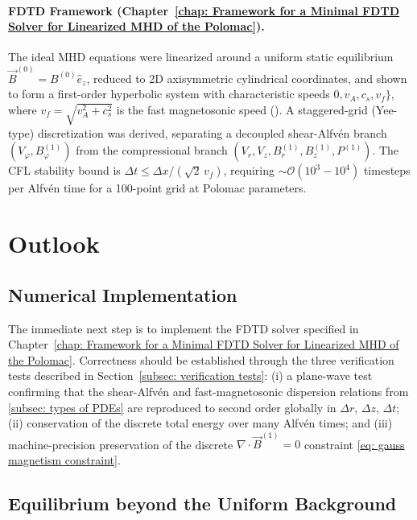 \paragraph{FDTD Framework (Chapter~\ref{chap: Framework for a Minimal FDTD Solver for Linearized MHD of the Polomac}).}
The ideal MHD equations were linearized around a uniform static equilibrium
$\vec{B}^{(0)}=B^{(0)}\hat{e}_z$, reduced to 2D axisymmetric cylindrical coordinates,
and shown to form a first-order hyperbolic system with characteristic speeds
$0, v_A, c_s, v_f\}$, where $v_f=\sqrt{v_A^2+c_s^2}$ is the fast
magnetosonic speed (\cite{Freidberg2014}).
A staggered-grid (Yee-type) discretization was derived, separating a decoupled
shear-Alfvén branch $(V_\varphi,B^{(1)}_\varphi)$ from the compressional branch
$(V_r,V_z,B^{(1)}_r,B^{(1)}_z,P^{(1)})$.
The CFL stability bound is $\Delta t\leq\Delta x/(\sqrt{2}\,v_f)$, requiring
$\sim\mathcal{O}(10^3-10^4)$ timesteps per Alfvén time for a 100-point grid at Polomac
parameters.

\section{Outlook}
\label{sec: outlook}

\subsection{Numerical Implementation}
\label{subsec: numerical implementation}

The immediate next step is to implement the FDTD solver specified in
Chapter~\ref{chap: Framework for a Minimal FDTD Solver for Linearized MHD of the Polomac}.
Correctness should be established through the three verification tests described in
Section~\ref{subsec: verification tests}:
(i) a plane-wave test confirming that the shear-Alfvén and fast-magnetosonic dispersion
relations from \autoref{subsec: types of PDEs} are
reproduced to second order globally in $\Delta r$, $\Delta z$, $\Delta t$;
(ii) conservation of the discrete total energy over many Alfvén times; and
(iii) machine-precision preservation of the discrete $\nabla\cdot\vec{B}^{(1)}=0$
constraint \eqref{eq: gauss magnetism constraint}.

\subsection{Equilibrium beyond the Uniform Background}
\label{subsec: equilibrium beyond uniform}

